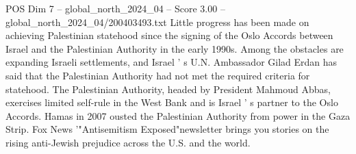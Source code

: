 \begin{textsample}{POS Dim 7 – global\_north\_2024\_04 – Score 3.00 – global\_north\_2024\_04/200403493.txt}
Little progress has been made on achieving Palestinian statehood since the signing of the Oslo Accords between Israel and the Palestinian Authority in the early 1990s.
Among the obstacles are expanding Israeli settlements, and Israel ' s U.N.
Ambassador Gilad Erdan has said that the Palestinian Authority had not met the required criteria for statehood.
The Palestinian Authority, headed by President Mahmoud Abbas, exercises limited self-rule in the West Bank and is Israel ' s partner to the Oslo Accords.
Hamas in 2007 ousted the Palestinian Authority from power in the Gaza Strip.
Fox News '"Antisemitism Exposed"newsletter brings you stories on the rising anti-Jewish prejudice across the U.S. and the world.

\end{textsample}
